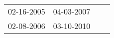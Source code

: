\begin{supertabular}{llll}
 02-16-2005 &  04-03-2007 \\
 02-08-2006 &  03-10-2010 \\
\end{supertabular}
